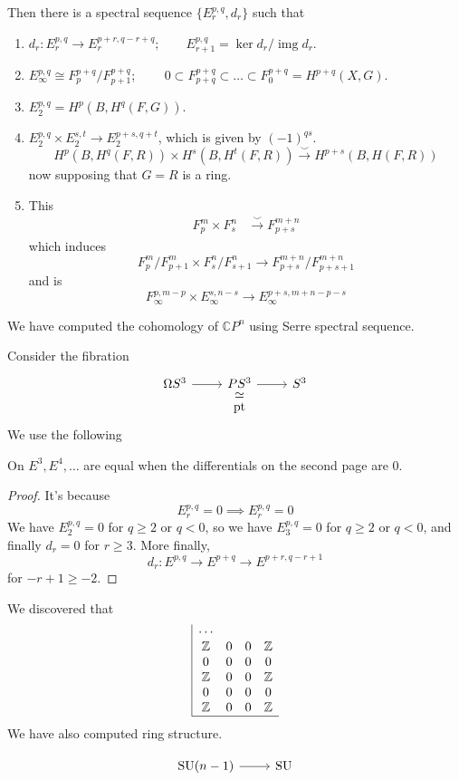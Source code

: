 \documentclass{article}
\newcommand{\C}{\mathbb{C}}
\newcommand{\Z}{\mathbb{Z}}
\DeclareMathOperator{\img}{img}
\DeclareMathOperator{\pt}{pt}
\DeclareMathOperator{\SU}{SU}
\begin{document}
Then there is a spectral sequence $\{E_r^{p,q},d_r\}$ such that
\begin{enumerate}[label*=\alph*.]
	\item $d_r:E_r^{p,q}\to E_r^{p+r,q-r+q};\qquad E_{r+1}^{p,q}=\ker d_r/\img d_r$.
	\item $E_{\infty}^{p,q}\cong F^{p+q}_p/F^{p+q}_{p+1}$; $\qquad 0\subset F^{p+q}_{p+q}\subset\ldots\subset F^{p+q}_0=H^{p+q}(X,G)$.
	\item $E^{p,q}_2=H^p(B,H^{q}(F,G))$.
	\item $E^{p,q}_2\times E^{s,t}_2\to E^{p+s,q+t}_2$, which is given by $(-1)^{qs}$.
	\[H^p(B,H^q(F,R))\times H^s(B,H^t(F,R))\overset{\smile}{\to} H^{p+s}(B,H(F,R))\]
	now supposing that $G=R$ is a ring.
	\item This
	\begin{align*}
		F^m_p\times F^n_s&\overset{\smile}{\to}F^{m+n}_{p+s}
	\end{align*}
	which induces
	\[F^m_p/F^m_{p+1}\times F^n_s/F^n_{s+1}\to F^{m+n}_{p+s}/F^{m+n}_{p+s+1}\]
	and is
	\[F_\infty^{p,m-p}\times E_\infty^{s,n-s}\to E_{\infty}^{p+s,m+n-p-s}\]
\end{enumerate}
\begin{example}
	We have computed the cohomology of $\C P^n$ using Serre spectral sequence.
\end{example}
\begin{example}
	Consider the fibration
	\[\begin{tikzcd}[row sep=tiny]
		\Omega S^3\arrow[r]&PS^3\arrow[r]&S^3\\
		&\pt\arrow[u,phantom,"\simeq"]
	\end{tikzcd}\]
	We use the following
	\begin{claim}
		On $E^3,E^4,\ldots$ are equal when the differentials on the second page are 0.
	\end{claim}
	\begin{proof}
		It's because
		\[E_r^{p,q}=0\implies E_r^{p,q}=0\]
		We have $E_2^{p,q}=0$ for $q\geq2$ or $q<0$, so we have $E_3^{p,q}=0$ for $q\geq2$ or $q<0$, and finally $d_r=0$ for $r\geq3$. More finally,
		\[d_r:E^{p,q}\to E^{p+q}\to E^{p+r,q-r+1}\]
		for $-r+1\geq-2$.
	\end{proof}
	We discovered that
	\begin{align*}
		\begin{array}{|cccc}
			\cdots&&&\\
			\Z&0&0&\Z\\
			0&0&0&0\\
			\Z&0&0&\Z\\
			0&0&0&0\\
			\Z&0&0&\Z\\
			\hline
		\end{array}
	\end{align*}
	We have also computed ring structure.
\end{example}

\begin{example}
	\[\begin{tikzcd}
		\SU(n-1)\arrow[r]&\SU
	\end{tikzcd}\]
\end{example}
\clearpage
\printbibliography
\end{document}
